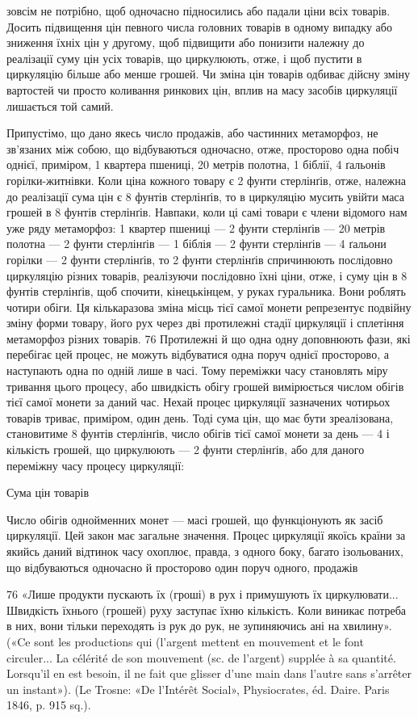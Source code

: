 зовсім не потрібно, щоб одночасно підносились або падали ціни
всіх товарів. Досить підвищення цін певного числа головних
товарів в одному випадку або зниження їхніх цін у другому,
щоб підвищити або понизити належну до реалізації суму цін
усіх товарів, що циркулюють, отже, і щоб пустити в циркуляцію
більше або менше грошей. Чи зміна цін товарів одбиває дійсну
зміну вартостей чи просто коливання ринкових цін, вплив на
масу засобів циркуляції лишається той самий.

Припустімо, що дано якесь число продажів, або частинних
метаморфоз, не зв’язаних між собою, що відбуваються одночасно,
отже, просторово одна побіч однієї, приміром, 1 квартера пшениці,
20 метрів полотна, 1 біблії, 4 ґальонів горілки-житнівки. Коли
ціна кожного товару є 2 фунти стерлінґів, отже, належна до реалізації
сума цін є 8 фунтів стерлінґів, то в циркуляцію мусить
увійти маса грошей в 8 фунтів стерлінґів. Навпаки, коли ці самі
товари є члени відомого нам уже ряду метаморфоз: 1 квартер
пшениці — 2 фунти стерлінґів — 20 метрів полотна — 2 фунти
стерлінґів — 1 біблія — 2 фунти стерлінґів — 4 ґальони горілки —
2 фунти стерлінґів, то 2 фунти стерлінґів спричинюють послідовно
циркуляцію різних товарів, реалізуючи послідовно їхні
ціни, отже, і суму цін в 8 фунтів стерлінґів, щоб спочити, кінецькінцем,
у руках гуральника. Вони роблять чотири обіги. Ця
кількаразова зміна місць тієї самої монети репрезентує подвійну
зміну форми товару, його рух через дві протилежні стадії циркуляції
і сплетіння метаморфоз різних товарів. 76 Протилежні й
що одна одну доповнюють фази, які перебігає цей процес, не можуть
відбуватися одна поруч однієї просторово, а наступають
одна по одній лише в часі. Тому переміжки часу становлять міру
тривання цього процесу, або швидкість обігу грошей вимірюється
числом обігів тієї самої монети за даний час. Нехай процес
циркуляції зазначених чотирьох товарів триває, приміром, один
день. Тоді сума цін, що має бути зреалізована, становитиме
8 фунтів стерлінґів, число обігів тієї самої монети за день — 4
і кількість грошей, що циркулюють — 2 фунти стерлінґів, або
для даного переміжну часу процесу циркуляції:

Сума цін товарів

Число обігів однойменних монет — масі грошей, що функціонують
як засіб циркуляції. Цей закон має загальне значення.
Процес циркуляції якоїсь країни за якийсь даний відтинок часу
охоплює, правда, з одного боку, багато ізольованих, що відбуваються
одночасно й просторово один поруч одного, продажів

76 «Лише продукти пускають їх (гроші) в рух і примушують їх
циркулювати... Швидкість їхнього (грошей) руху заступає їхню кількість.
Коли виникає потреба в них, вони тільки переходять із рук до рук, не
зупиняючись ані на хвилину». («Ce sont les productions qui (l’argent
mettent en mouvement et le font circuler... La célérité de son mouvement
(sc. de l’argent) supplée à sa quantité. Lorsqu’il en est besoin, il ne fait
que glisser d’une main dans l’autre sans s’arrêter un instant»). (Le Trosne:
«De l’Intérêt Social», Physiocrates, éd. Daire. Paris 1846, p. 915 sq.).
